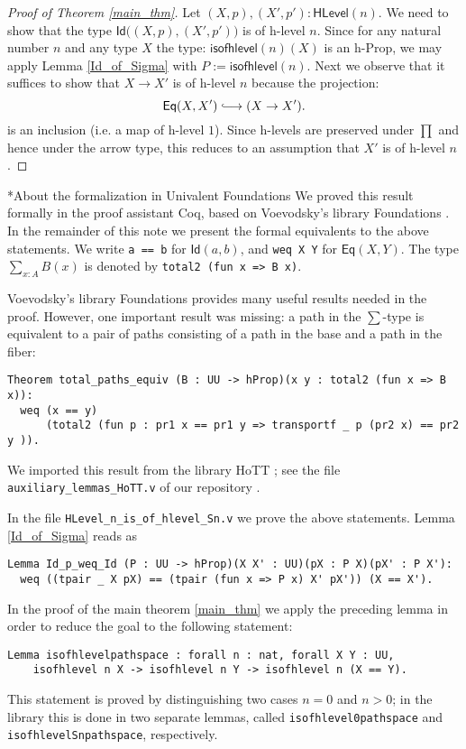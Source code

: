 \documentclass[11pt]{scrartcl}
\makeatletter
\theoremstyle{plain}
\theoremstyle{definition}
\newcommand{\Eq}{\mathsf{Eq}}
\newcommand{\HLevel}{\mathsf{HLevel}}
\newcommand{\Id}{\mathsf{Id}}
\newcommand{\isofhlevel}{\mathsf{isofhlevel}}
\newcommand{\oftype}{\! : \!}
\newcommand*{\into}{\ensuremath{\lhook\joinrel\relbar\joinrel\rightarrow}}
\renewcommand{\paragraph}{\@startsection{paragraph}{4}{0mm}{-0.5\baselineskip}{-1ex}{\bf}}
\makeatother
\begin{document}
\begin{proof}[Proof of Theorem \ref{main_thm}]
 Let $(X, p), (X', p') \oftype \HLevel(n)$. We need to show that the type $\Id \big( (X, p), (X', p')\big)$ is of h-level $n$. Since for any natural number $n$ and any type $X$ the type: $\isofhlevel(n)(X)$ is an h-Prop, we may apply Lemma \ref{Id_of_Sigma} with $P := \isofhlevel(n)$. Next we observe that it suffices to show that $X \rightarrow X'$ is of h-level $n$ because the projection:
 \[\Eq (X, X') \into (X \rightarrow X').\]
 is an inclusion (i.e. a map of h-level $1$). Since h-levels are preserved under $\prod$ and hence under the arrow type, this reduces to an assumption that $X'$ is of h-level $n$.
\end{proof}

\paragraph*{About the formalization in Univalent Foundations}
We proved this result formally in the proof assistant \textsf{Coq}, based on Voevodsky's
library \textsf{Foundations} \parencite{voevodsky:univalent-foundations-coq}.
In the remainder of this note we present the formal equivalents to the above statements.
We write \lstinline!a == b! for $\Id(a, b)$, and \lstinline!weq X Y! for $\Eq(X, Y)$. The type $\sum_{x : A} B(x)$ is denoted by
\lstinline!total2 (fun x => B x)!.

Voevodsky's library \textsf{Foundations} provides many useful results needed in the proof. However, one important
result was missing: a path in the $\sum$-type is equivalent to a pair of paths consisting of a path in the base and a path in the fiber:
\begin{lstlisting}
Theorem total_paths_equiv (B : UU -> hProp)(x y : total2 (fun x => B x)):
  weq (x == y)
      (total2 (fun p : pr1 x == pr1 y => transportf _ p (pr2 x) == pr2 y )).
\end{lstlisting}
We imported this result from the library \textsf{HoTT} \parencite{hott:repo}; see the file
{\verb+auxiliary_lemmas_HoTT.v+} of our repository \parencite{ahrens-kapulkin:h-level-repo}.

In the file {\verb+HLevel_n_is_of_hlevel_Sn.v+} we prove the above statements.
Lemma \ref{Id_of_Sigma} reads as
\begin{lstlisting}
Lemma Id_p_weq_Id (P : UU -> hProp)(X X' : UU)(pX : P X)(pX' : P X'):
  weq ((tpair _ X pX) == (tpair (fun x => P x) X' pX')) (X == X').
\end{lstlisting}
In the proof of the main theorem \ref{main_thm} we apply the preceding lemma in order to
reduce the goal to the following statement:
\begin{lstlisting}
Lemma isofhlevelpathspace : forall n : nat, forall X Y : UU,
    isofhlevel n X -> isofhlevel n Y -> isofhlevel n (X == Y).
\end{lstlisting}
This statement is proved by distinguishing two cases $n = 0$ and $n > 0$; in the library this is done in
two separate lemmas, called \lstinline!isofhlevel0pathspace! and \lstinline!isofhlevelSnpathspace!,
respectively.
\end{document}
